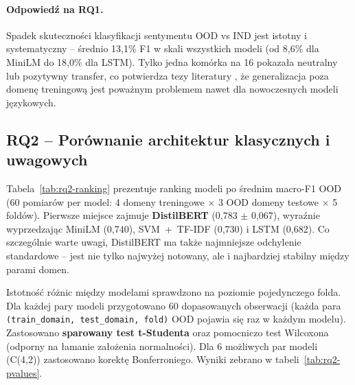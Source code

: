 \documentclass[runningheads]{llncs}
\begin{document}
\paragraph{Odpowiedź na RQ1.}
Spadek skuteczności klasyfikacji sentymentu OOD vs IND jest istotny i systematyczny -- średnio 13{,}1\% F1 w skali wszystkich modeli (od 8{,}6\% dla MiniLM do 18{,}0\% dla LSTM). Tylko jedna komórka na 16 pokazała neutralny lub pozytywny transfer, co potwierdza tezy literatury \cite{yang2023outofdistributiongeneralizationtextclassification,lang2023surveyoutofdistributiondetectionnlp}, że generalizacja poza domenę treningową jest poważnym problemem nawet dla nowoczesnych modeli językowych.

\subsection*{RQ2 -- Porównanie architektur klasycznych i uwagowych}
Tabela~\ref{tab:rq2-ranking} prezentuje ranking modeli po średnim macro-F1 OOD (60 pomiarów per model: 4 domeny treningowe $\times$ 3 OOD domeny testowe $\times$ 5 foldów). Pierwsze miejsce zajmuje \textbf{DistilBERT} (0{,}783 $\pm$ 0{,}067), wyraźnie wyprzedzając MiniLM (0{,}740), SVM~+~TF-IDF (0{,}730) i LSTM (0{,}682). Co szczególnie warte uwagi, DistilBERT ma także najmniejsze odchylenie standardowe -- jest nie tylko najwyżej notowany, ale i najbardziej stabilny między parami domen.

\begin{table}[h]
\centering
\caption{Ranking modeli po średnim macro-F1 OOD (60 pomiarów). Spadek $\Delta$ liczony jako średnie F1 IND $-$ średnie F1 OOD.}
\label{tab:rq2-ranking}

\end{table}

Istotność różnic między modelami sprawdzono na poziomie pojedynczego folda. 
Dla każdej pary modeli przygotowano 60 dopasowanych obserwacji (każda para \texttt{(train\_domain, test\_domain, fold)} OOD pojawia się raz w każdym modelu). 
Zastosowano \textbf{sparowany test t-Studenta} oraz pomocniczo test Wilcoxona (odporny na łamanie założenia normalności). Dla 6 możliwych par modeli (C(4,2)) zastosowano korektę Bonferroniego. Wyniki zebrano w tabeli~\ref{tab:rq2-pvalues}.

\begin{table}[h]
\centering
\caption{Sparowane testy istotności różnicy macro-F1 OOD między parami modeli. $\overline{\Delta}$F1 oznacza średnią różnicę (Model A $-$ Model B); ujemne wartości oznaczają przewagę Modelu B. Gwiazdki: * $p<0{,}05$, ** $p<0{,}01$, *** $p<0{,}001$ (po korekcie Bonferroniego, $n=60$ par foldów).}
\label{tab:rq2-pvalues}

\end{table}
\end{document}
